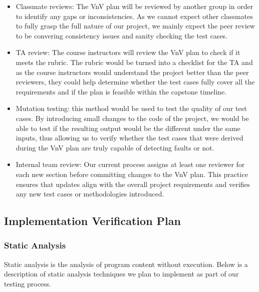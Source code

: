 \documentclass[12pt, titlepage]{article}
\begin{document}
\begin{itemize}
  \item Classmate reviews: The VnV plan will be reviewed by another group in order to identify any gaps or inconsistencies. 
  As we cannot expect other classmates to fully grasp the full nature of our project, we mainly expect the peer review to be 
  convering consistency issues and sanity checking the test cases. 
  \item TA review: The course instructors will review the VnV plan to check if it meets the rubric. The rubric would be turned into a 
  checklist for the TA and as the course instructors would understand the project better than the peer reviewers, they could help 
  determine whether the test cases fully cover all the requirements and if the plan is feasible within the capstone timeline. 
  \item Mutation testing: this method would be used to test the quality of our test cases. By introducing small changes to the code 
  of the project, we would be able to test if the resulting output would be the different under the same inputs, thus allowing us to 
  verify whether the test cases that were derived during the VnV plan are truly capable of detecting faults or not.
  \item Internal team review: Our current process assigns at least one reviewer for each new section before committing changes to the VnV plan.
  This practice ensures that updates align with the overall project requirements and verifies any new test cases or methodologies introduced.

\end{itemize}

\subsection{Implementation Verification Plan}
\subsubsection{Static Analysis}
Static analysis is the analysis of program content without execution. Below is a description of static analysis techniques we plan to implement as part of our testing process.
\end{document}
